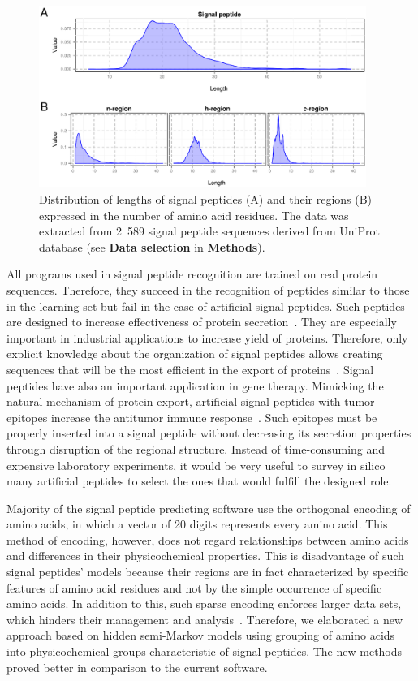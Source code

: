 \documentclass[fleqn,10pt,twoside]{gcb15submission}
\begin{document}
\begin{figure}[ht]\centering
\includegraphics[width=0.95\textwidth]{figures/reglen.eps}
\caption{Distribution of lengths of signal peptides (A) and their regions (B) expressed in the number of amino acid residues. The data was extracted from 2~589 signal peptide sequences derived from UniProt database (see \textbf{Data selection} in \textbf{Methods}).}
\label{fig:reglen}
\end{figure}

All programs used in signal peptide recognition are trained on real protein sequences. Therefore, they succeed in the recognition of peptides similar to those in the learning set but fail in the case of artificial signal peptides. Such peptides are designed to increase effectiveness of protein secretion~\citep{2010futatsumorisugaisignal}. They are especially important in industrial applications to increase yield of proteins. Therefore, only explicit knowledge about the organization of signal peptides allows creating sequences that will be the most efficient in the export of proteins~\citep{2013ngengineering}. Signal peptides have also an important application in gene therapy. Mimicking the natural mechanism of protein export, artificial signal peptides with tumor epitopes increase the antitumor immune response~\citep{2003heenhanced}. Such epitopes must be properly inserted into a signal peptide without decreasing its secretion properties through disruption of the regional structure. Instead of time-consuming and expensive laboratory experiments, it would be very useful to survey in silico many artificial peptides to select the ones that would fulfill the designed role.

Majority of the signal peptide predicting software use the orthogonal encoding of amino acids, in which a vector of 20 digits represents every amino acid. This method of encoding, however, does not regard relationships between amino acids and differences in their physicochemical properties. This is disadvantage of such signal peptides' models because their regions are in fact characterized by specific features of amino acid residues and not by the simple occurrence of specific amino acids. In addition to this, such sparse encoding enforces larger data sets, which hinders their management and analysis~\citep{2002linamino}. Therefore, we elaborated a new approach based on hidden semi-Markov models using grouping of amino acids into physicochemical groups characteristic of signal peptides. The new methods proved better in comparison to the current software.
\end{document}
